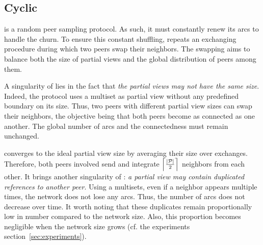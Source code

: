 \subsection{Cyclic}
\label{subsec:cyclic}

\SPRAY{} is a random peer sampling protocol. As such, it must constantly
renew its arcs to handle the churn.  To ensure this constant shuffling,
\SPRAY{} repeats an exchanging procedure during which two peers swap their
neighbors. The swapping aims to balance both the size of partial views and the
global distribution of peers among them.

A singularity of \SPRAY{} lies in the fact that \emph{the partial views may
  not have the same size}. Indeed, the protocol uses a multiset as partial view
without any predefined boundary on its size. Thus, two peers with different
partial view sizes can swap their neighbors, the objective being that both
peers become as connected as one another. The global number of arcs and the
connectedness must remain unchanged.

\SPRAY{} converges to the ideal partial view size by averaging their size
over exchanges. Therefore, both peers involved send and integrate
$\left\lceil|\mathcal{P}|\over{2}\right\rceil$ neighbors from each other.  It
brings another singularity of \SPRAY{}: \emph{a partial view may contain
  duplicated references to another peer}. Using a multisets, even if a neighbor
appears multiple times, the network does not lose any arcs.  Thus, the number
of arcs does not decrease over time. It worth noting that these duplicates
remain proportionally low in number compared to the network size. Also, this
proportion becomes negligible when the network size grows (cf. the experiments
section~\ref{sec:experiments}). 

